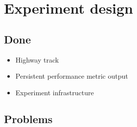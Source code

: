 \chapter*{Experiment design}
\label{ch:experiment}
\setcounter{page}{1}

\iffalse
Open questions:
- Discretize driver action?
- Discretize distraction time intervals?
- Reward calculation; Distance / Angle / Intensity?
- Overcorrecting behavior when driver regains attentiveness?
- Size of the planning horizon?
- How to smooth the agent's action selection (oscillates)?
- Which observations to use and what discretization bins?
- Cheat when an observation cannot be found in the tree?

ToDO:
- Describe discretization procedure
- Describe reward correctly
\fi

\section*{Done}

\begin{itemize}
    \item Highway track
    \item Persistent performance metric output
    \item Experiment infrastructure
\end{itemize}

\section*{Problems}

